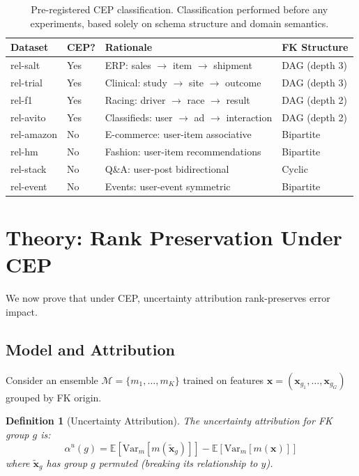 \documentclass{article}
\newtheorem{definition}{Definition}
\begin{document}
\begin{table}[t]
\centering
\caption{Pre-registered CEP classification. Classification performed before any
experiments, based solely on schema structure and domain semantics.}
\label{tab:preregistration}
\small
\begin{tabular}{llll}
\toprule
Dataset & CEP? & Rationale & FK Structure \\
\midrule
rel-salt & Yes & ERP: sales $\to$ item $\to$ shipment & DAG (depth 3) \\
rel-trial & Yes & Clinical: study $\to$ site $\to$ outcome & DAG (depth 3) \\
rel-f1 & Yes & Racing: driver $\to$ race $\to$ result & DAG (depth 2) \\
rel-avito & Yes & Classifieds: user $\to$ ad $\to$ interaction & DAG (depth 2) \\
\midrule
rel-amazon & No & E-commerce: user-item associative & Bipartite \\
rel-hm & No & Fashion: user-item recommendations & Bipartite \\
rel-stack & No & Q\&A: user-post bidirectional & Cyclic \\
rel-event & No & Events: user-event symmetric & Bipartite \\
\bottomrule
\end{tabular}
\end{table}

\section{Theory: Rank Preservation Under CEP}
\label{sec:theory}

We now prove that under CEP, uncertainty attribution rank-preserves error impact.

\subsection{Model and Attribution}

Consider an ensemble $\mathcal{M} = \{m_1, \ldots, m_K\}$ trained on features
$\mathbf{x} = (\mathbf{x}_{g_1}, \ldots, \mathbf{x}_{g_G})$ grouped by FK origin.

\begin{definition}[Uncertainty Attribution]
The uncertainty attribution for FK group $g$ is:
\begin{equation}
\alpha^u(g) = \mathbb{E}[\text{Var}_m[m(\tilde{\mathbf{x}}_g)]] - \mathbb{E}[\text{Var}_m[m(\mathbf{x})]]
\end{equation}
where $\tilde{\mathbf{x}}_g$ has group $g$ permuted (breaking its relationship to $y$).
\end{definition}
\end{document}

